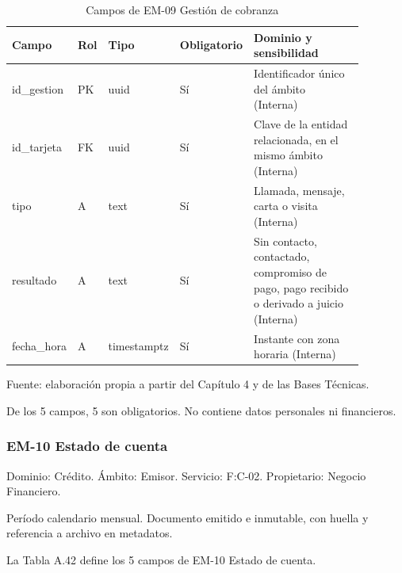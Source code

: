 \documentclass[11pt]{article}
\begin{document}
\begin{table}[htbp]
\caption{Campos de EM-09 Gestión de cobranza}\label{tab:d_em09}
\centering
\begin{tabular}{@{}p{0.167\linewidth}p{0.070\linewidth}p{0.079\linewidth}p{0.097\linewidth}p{0.465\linewidth}@{}}
\toprule Campo & Rol & Tipo & Obligatorio & Dominio y sensibilidad \\
\midrule
id\_gestion & PK & uuid & Sí & Identificador único del ámbito (Interna) \\
id\_tarjeta & FK & uuid & Sí & Clave de la entidad relacionada, en el mismo ámbito (Interna) \\
tipo & A & text & Sí & Llamada, mensaje, carta o visita (Interna) \\
resultado & A & text & Sí & Sin contacto, contactado, compromiso de pago, pago recibido o derivado a juicio (Interna) \\
fecha\_hora & A & timestamptz & Sí & Instante con zona horaria (Interna) \\
\bottomrule
\end{tabular}
\par\smallskip
{\raggedright Fuente: elaboración propia a partir del Capítulo 4 y de las Bases Técnicas.\par}
\end{table}


De los 5 campos, 5 son obligatorios. No contiene datos personales ni financieros.

\subsubsection{EM-10 Estado de cuenta}

Dominio: Crédito. Ámbito: Emisor. Servicio: F:C-02. Propietario: Negocio Financiero.

Período calendario mensual. Documento emitido e inmutable, con huella y referencia a archivo en metadatos.

La Tabla A.42 define los 5 campos de EM-10 Estado de cuenta.
\end{document}
